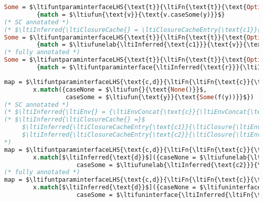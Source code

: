 {
\singlespacing
\begin{lstlisting}[language=ml,mathescape=true]
Some = $\ltifuntparaminterfaceLHS{\text{t}}{\ltiFn{\text{t}}{\text{Option[t]}}}{\text{y}}$
         {match = $\ltiufun{\text{v}}{\text{v.caseSome(y)}}$}
(* SC annotated *)
(* $\ltiInferred{\ltiClosureCache{} = \ltiClosureCacheEntry{\text{c1}}{\ltiClosure{\ltiEnvConcat{\text{t}}{\hastype{\text{y}}{\text{t}}}}{\ltiNotInferred{\ltifuntparaminterface{\ltiInferred{\text{r}}}{\ltiInferred{\ltiFn{\text{OptionVisitor[t,r]}}{\text{r}}}}{\text{v}}{\text{v.caseSome(y)}}}}}}$ *)
Some = $\ltifuntparaminterfaceLHS{\text{t}}{\ltiFn{\text{t}}{\text{Option[t]}}}{\text{y}}$
         {match = $\ltiufunelab{\ltiInferred{\text{c1}}}{\text{v}}{\text{v.caseSome(y)}}$}
(* fully annotated *)
Some = $\ltifuntparaminterfaceLHS{\text{t}}{\ltiFn{\text{t}}{\text{Option[t]}}}{\text{y}}$
         {match = $\ltifuntparaminterface{\ltiInferred{\text{r}}}{\ltiInferred{\ltiFn{\text{OptionVisitor[t,r]}}{\text{r}}}}{\text{v}}{\text{v.caseSome(y)}}$}
\end{lstlisting}
}

{
\singlespacing
\begin{lstlisting}[language=ml,mathescape=true]
map = $\ltifuntparaminterfaceLHS{\text{c,d}}{\ltiFn{\ltiFn{\text{c}}{\text{d}},\text{Option[c]}}{\text{Option[d]}}}{\text{f,x}}$
        x.match({caseNone = $\ltiufun{}{\text{None()}}$,
                 caseSome = $\ltiufun{\text{y}}{\text{Some(f(y))}}$})
(* SC annotated *)
(* $\ltiInferred{\ltiEnv{} = {\ltiEnvConcat{\text{c}}{\ltiEnvConcat{\text{d}}{\ltiEnvConcat{\hastype{\text{f}}{\ltiFn{\text{c}}{\text{d}}}}{\hastype{\text{x}}{\text{Option[c]}}}}}}}$ *)
(* $\ltiInferred{\ltiClosureCache{} =}$
     $\ltiInferred{\ltiClosureCacheEntry{\text{c1}}{\ltiClosure{\ltiEnv{}}{\ltiNotInferred{\ltifuninterface{\ltiInferred{\ltiFn{}{\ltilstOption{\ltiBot}}}}{}{\text{None[\ltiInferred{\ltiBot}]()}}}}}}$,
     $\ltiInferred{\ltiClosureCacheEntry{\text{c2}}{\ltiClosure{\ltiEnv{}}{\ltiNotInferred{\ltifuninterface{\ltiInferred{\ltiFn{\text{c}}{\ltilstOption{\text{d}}}}}{\text{y}}{\text{Some[\ltiInferred{\text{d}}](f(y))}}}}}}$
*)
map = $\ltifuntparaminterfaceLHS{\text{c,d}}{\ltiFn{\ltiFn{\text{c}}{\text{d}},\text{Option[c]}}{\text{Option[d]}}}{\text{f,x}}$
        x.match[$\ltiInferred{\text{d}}$]({caseNone = $\ltiufunelab{\ltiInferred{\text{c1}}}{}{\text{None()}}$,
                    caseSome = $\ltiufunelab{\ltiInferred{\text{c2}}}{\text{y}}{\text{Some(f(y))}}$})
(* fully annotated *)
map = $\ltifuntparaminterfaceLHS{\text{c,d}}{\ltiFn{\ltiFn{\text{c}}{\text{d}},\text{Option[c]}}{\text{Option[d]}}}{\text{f,x}}$
        x.match[$\ltiInferred{\text{d}}$]({caseNone = $\ltifuninterface{\ltiInferred{\ltiFn{}{\ltilstOption{\ltiBot}}}}{}{\text{None[\ltiInferred{\ltiBot}]()}}$,
                    caseSome = $\ltifuninterface{\ltiInferred{\ltiFn{\text{c}}{\ltilstOption{\text{d}}}}}{\text{y}}{\text{Some[\ltiInferred{\text{d}}](f(y))}}$})
\end{lstlisting}
}


